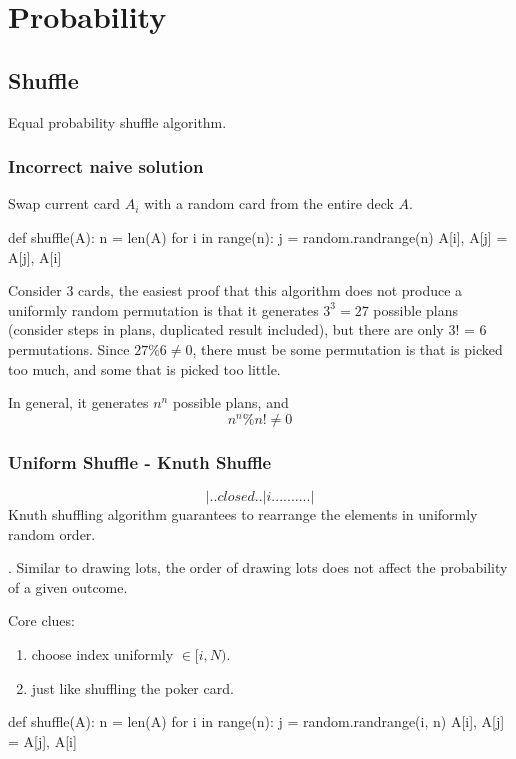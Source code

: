 \chapter{Probability}


\section{Shuffle}
Equal probability shuffle algorithm.

\subsection{Incorrect naive solution}
Swap current card $A_i$ with a random card from the entire deck $A$. 

\begin{python}
def shuffle(A):
  n = len(A)
  for i in range(n):
    j = random.randrange(n)
    A[i], A[j] = A[j], A[i]
\end{python}

Consider 3 cards, the easiest proof that this algorithm does not produce a uniformly random permutation is that it generates $3^3=27$ possible plans (consider steps in plans, duplicated result included), but there are only 3! = 6 permutations. Since $27\%6 \neq 0$, there must be some permutation is that is picked too much, and some that is picked too little. 

In general, it generates $n^n$ possible plans, and
$$
n^n \% n! \neq 0
$$ 
\subsection{Uniform Shuffle - Knuth Shuffle}
$$
|..closed..|i..........|
$$
Knuth shuffling algorithm guarantees to rearrange the elements in uniformly random order. 

. Similar to drawing lots, the order of drawing lots does not affect the probability of a given outcome.

Core clues:
\begin{enumerate}
\item choose index uniformly $\in [i, N)$.
\item just like shuffling the poker card.
\end{enumerate}

\begin{python}
def shuffle(A):
  n = len(A)
  for i in range(n):
    j = random.randrange(i, n)
    A[i], A[j] = A[j], A[i]
\end{python}

